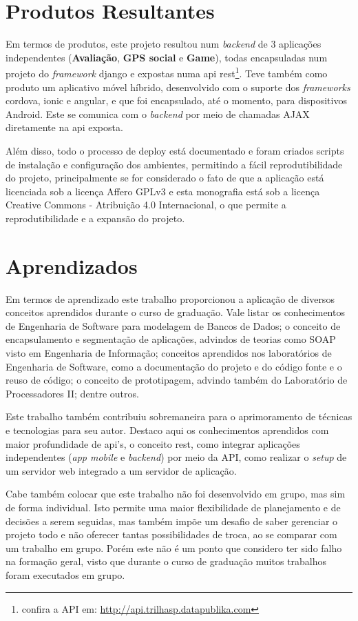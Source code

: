 \section{Produtos Resultantes}
Em termos de produtos, este projeto resultou num \textit{backend} de 3 aplicações independentes (\textbf{Avaliação}, \textbf{GPS social} e \textbf{Game}), todas encapsuladas num projeto do \textit{framework} \gls{django} e expostas numa \gls{api} \gls{rest}\footnote{confira a API em: \url{http://api.trilhasp.datapublika.com}}. Teve também como produto um aplicativo móvel híbrido, desenvolvido com o suporte dos \textit{frameworks} \gls{cordova}, \gls{ionic} e \gls{angular}, e que foi encapsulado, até o momento, para dispositivos Android. Este se comunica com o \textit{backend} por meio de chamadas AJAX diretamente na \gls{api} exposta.

Além disso, todo o processo de deploy está documentado e foram criados scripts de instalação e configuração dos ambientes, permitindo a fácil reprodutibilidade do projeto, principalmente se for considerado o fato de que a aplicação está licenciada sob a licença Affero GPLv3 e esta monografia está sob a licença Creative Commons - Atribuição 4.0 Internacional, o que permite a reprodutibilidade e a expansão do projeto.

\section{Aprendizados}
Em termos de aprendizado este trabalho proporcionou a aplicação de diversos conceitos aprendidos durante o curso de graduação. Vale listar os conhecimentos de Engenharia de Software para modelagem de Bancos de Dados; o conceito de encapsulamento e segmentação de aplicações, advindos de teorias como SOAP visto em Engenharia de Informação; conceitos aprendidos nos laboratórios de Engenharia de Software, como a documentação do projeto e do código fonte e o reuso de código; o conceito de prototipagem, advindo também do Laboratório de Processadores II; dentre outros.

Este trabalho também contribuiu sobremaneira para o aprimoramento de técnicas e tecnologias para seu autor. Destaco aqui os conhecimentos aprendidos com maior profundidade de \gls{api}'s, o conceito \gls{rest}, como integrar aplicações independentes (\textit{app mobile} e \textit{backend}) por meio da API, como realizar o \textit{setup} de um servidor web integrado a um servidor de aplicação.

Cabe também colocar que este trabalho não foi desenvolvido em grupo, mas sim de forma individual. Isto permite uma maior flexibilidade de planejamento e de decisões a serem seguidas, mas também impõe um desafio de saber gerenciar o projeto todo e não oferecer tantas possibilidades de troca, ao se comparar com um trabalho em grupo. Porém este não é um ponto que considero ter sido falho na formação geral, visto que durante o curso de graduação muitos trabalhos foram executados em grupo.

